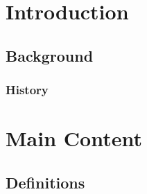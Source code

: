 \documentclass[openany]{book}
\begin{document}

\tableofcontents
\newpage

\chapter{Introduction}
\chapterpage
\section{Background}
\lipsum[1]
\subsection{History}
\lipsum[2]

\chapter{Main Content}
\chapterpage
\section{Definitions}
\begin{mydefinition}
\lipsum[1-6]
\end{mydefinition}
\end{document}
